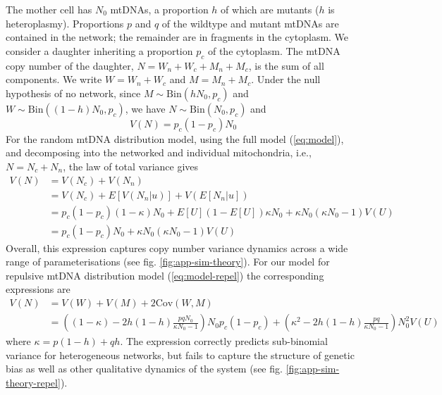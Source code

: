 \documentclass{article}
\begin{document}
\begin{appendices}
The mother cell has $N_0$ mtDNAs, a proportion $h$ of which are mutants ($h$ is heteroplasmy). Proportions $p$ and $q$ of the wildtype and mutant mtDNAs are contained in the network; the remainder are in fragments in the cytoplasm. 
We consider a daughter inheriting a proportion $p_c$ of the cytoplasm. The mtDNA copy number of the daughter, $N = W_n+W_c+M_n+M_c$, is the sum of all components. We write $W = W_n + W_c$ and $M = M_n+M_c$. Under the null hypothesis of no network, since $M\sim \mathrm{Bin}(hN_0,p_c)$ and $W\sim\mathrm{Bin}((1-h)N_0,p_c)$, we have $N \sim \mathrm{Bin}(N_0, p_c)$ and 
\begin{equation}\label{eq:app-vn-null}
    V(N)=p_c(1-p_c)N_0
\end{equation}
For the random mtDNA distribution model, using the full model (\ref{eq:model}), and decomposing into the networked and individual mitochondria, i.e., $N=N_c+N_n$, the law of total variance gives
\begin{equation}
    \begin{split}
    V(N)&=V(N_c)+V(N_n)\\
         &=V(N_c)+E[V(N_n|u)]+V(E[N_n|u])\\
         &= p_c(1-p_c)(1-\kappa)N_0
          + E[U](1-E[U])\kappa N_0+\kappa N_0(\kappa N_0-1)V(U)\\
         &=p_c(1-p_c)N_0+\kappa N_0(\kappa N_0-1)V(U)
    \end{split}
\end{equation}
Overall, this expression captures copy number variance dynamics across a wide range of parameterisations (see fig. \ref{fig:app-sim-theory}). For our model for repulsive mtDNA distribution model (\ref{eq:model-repel}) the corresponding expressions are
\begin{equation}
    \begin{split}
    V(N)&=V(W)+V(M)+2\mathrm{Cov}(W,M)\\
         &=\left((1-\kappa)-2h(1-h)\frac{pqN_0}{\kappa N_0-1}\right)N_0p_c(1-p_c)
         +\left(\kappa^2-2h(1-h)\frac{pq}{\kappa N_0-1}\right)N_0^2V(U)
    \end{split}
\end{equation}
where $\kappa = p(1-h)+qh$. The expression correctly predicts sub-binomial variance for heterogeneous networks, but fails to capture the structure of genetic bias as well as other qualitative dynamics of the system (see fig. \ref{fig:app-sim-theory-repel}).


\end{appendices}
\end{document}
